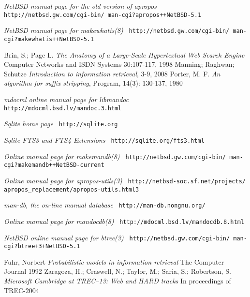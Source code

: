 \documentclass[letterpaper,twocolumn,10pt]{article}
\begin{document}
\begin{thebibliography}{20}
\emph{NetBSD manual page for the old version of apropos}
\newline
{\tt
http://netbsd.gw.com/cgi-bin/
man-cgi?apropos++NetBSD-5.1
}

\emph{NetBSD manual page for makewhatis(8)}
\newline
{\tt
http://netbsd.gw.com/cgi-bin/
man-cgi?makewhatis++NetBSD-5.1
}

Brin, S.; Page L.
\emph{The Anatomy of a Large-Scale Hypertextual Web Search Engine}
Computer Networks and ISDN Systems
30:107-117, 1998
Manning; Raghwan; Schutze
\emph{Introduction to information retrieval},
3-9,
2008
Porter, M. F.
\emph{An algorithm for suffix stripping},
Program,
14(3): 130-137,
1980

\emph{mdocml online manual page for
libmandoc}
\newline
{\tt
http://mdocml.bsd.lv/mandoc.3.html
}

\emph{Sqlite home page}
\newline
{\tt
http://sqlite.org
}

\emph{Sqlite FTS3 and FTS4 Extensions}
\newline
{\tt
http://sqlite.org/fts3.html
}

\emph{Online manual page for makemandb(8)}
\newline
{\tt
http://netbsd.gw.com/cgi-bin/
man-cgi?makemandb++NetBSD-current
}

\emph{Online manual page for apropos-utils(3)}
\newline
{\tt
http://netbsd-soc.sf.net/projects/
apropos\_replacement/apropos-utils.html3
}

\emph{man-db, the on-line manual database}
\newline
{\tt
http://man-db.nongnu.org/
}

\emph{Online manual page for mandocdb(8)}
\newline
{\tt
http://mdocml.bsd.lv/mandocdb.8.html
}

\emph{NetBSD online manual page for btree(3)}
\newline
{\tt
http://netbsd.gw.com/cgi-bin/
man-cgi?btree+3+NetBSD-5.1
}

Fuhr, Norbert
\emph{Probabilistic models in information
retrieval}
The Computer Journal
1992
Zaragoza, H.; Craswell, N.; Taylor, M.;
Saria, S.; Robertson, S.
\emph{Microsoft Cambridge at TREC–13: Web
and HARD tracks}
In proceedings of TREC-2004


\end{thebibliography}
\end{document}
